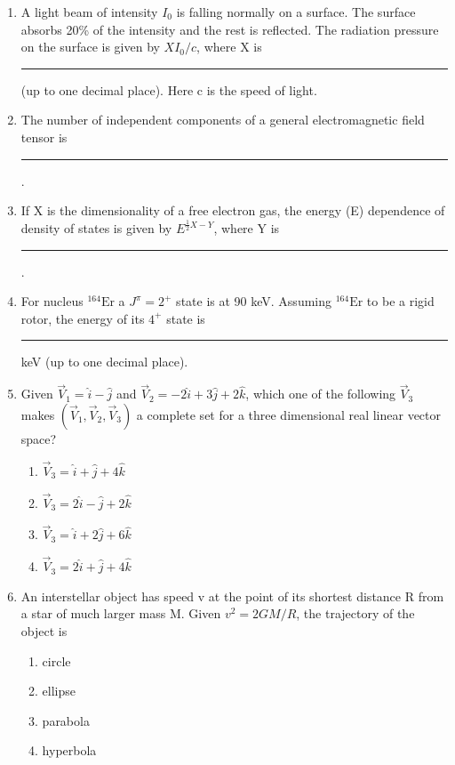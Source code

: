 \documentclass[journal,12pt,onecolumn]{IEEEtran}
\theoremstyle{remark}
\begin{document}
\begin{enumerate}
    \item A light beam of intensity $I_0$ is falling normally on a surface. The surface absorbs 20\% of the intensity and the rest is reflected. The radiation pressure on the surface is given by $X I_0/c$, where X is \rule{1cm}{0.4pt} (up to one decimal place). Here c is the speed of light.\hfill{}

    \item The number of independent components of a general electromagnetic field tensor is \rule{1cm}{0.4pt}. \hfill{}

    \item If X is the dimensionality of a free electron gas, the energy (E) dependence of density of states is given by $E^{\frac{1}{2}X-Y}$, where Y is \rule{1cm}{0.4pt}.\hfill{}

    \item For nucleus $^{164}\text{Er}$ a $J^\pi=2^+$ state is at 90 keV. Assuming $^{164}\text{Er}$ to be a rigid rotor, the energy of its $4^+$ state is \rule{1cm}{0.4pt} keV (up to one decimal place).\hfill{}

    \item Given $\vec{V}_1 = \hat{i} - \hat{j}$ and $\vec{V}_2 = -2\hat{i} + 3\hat{j} + 2\hat{k}$, which one of the following $\vec{V}_3$ makes $(\vec{V}_1, \vec{V}_2, \vec{V}_3)$ a complete set for a three dimensional real linear vector space?
    \hfill{} \begin{enumerate}
        \item $\vec{V}_3 = \hat{i} + \hat{j} + 4\hat{k}$
        \item $\vec{V}_3 = 2\hat{i} - \hat{j} + 2\hat{k}$
        \item $\vec{V}_3 = \hat{i} + 2\hat{j} + 6\hat{k}$
        \item $\vec{V}_3 = 2\hat{i} + \hat{j} + 4\hat{k}$
    \end{enumerate}

    \item An interstellar object has speed v at the point of its shortest distance R from a star of much larger mass M. Given $v^2 = 2GM/R$, the trajectory of the object is
    \hfill{} \begin{enumerate}
        \item circle
        \item ellipse
        \item parabola
        \item hyperbola
    \end{enumerate}


\end{enumerate}
\end{document}
